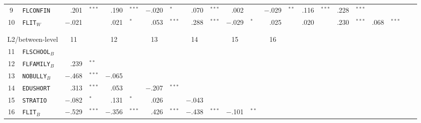 {\begin{tabular}{cl r@{\hskip -0.1mm}l r@{\hskip -0.1mm}l r@{\hskip -0.1mm}l r@{\hskip -0.1mm}l r@{\hskip -0.1mm}l r@{\hskip -0.1mm}l r@{\hskip -0.1mm}l r@{\hskip -0.1mm}l r@{\hskip -0.1mm}l r@{\hskip -0.1mm}l}
            9     & \texttt{FLCONFIN} & .201 & $^{***}$ & .190 & $^{***}$ & $-$.020 & $^{*}$ & .070 & $^{***}$ & .002 &       & $-$.029 & $^{**}$ & .116 & $^{***}$ & .228 & $^{***}$ &       &       &       &  \\
            10    & \texttt{FLIT}$_W$  & $-$.021 &       & .021 & $^{*}$ & .053 & $^{***}$ & .288 & $^{***}$ & $-$.029 & $^{*}$ & .025 &       & .020 &       & .230 & $^{***}$ & .068 & $^{***}$ &       &  \\
            \midrule
                  &       &       &       &       &       &       &       &       &       &       &       &       &       &       &       &       &       &       &       &       &  \\
                  &       &       &       &       &       &       &       &       &       &       &       &       &       &       &       &       &       &       &       &       &  \\
        \cmidrule{1-14}    \multicolumn{2}{c}{L2/between-level} & \multicolumn{1}{c}{11} &       & \multicolumn{1}{c}{12} &       & \multicolumn{1}{c}{13} &       & \multicolumn{1}{c}{14} &       & \multicolumn{1}{c}{15} &       & \multicolumn{1}{c}{16} &       &       &       &       &       &       &       &       &  \\
        \cmidrule{1-14}    11    & \texttt{FLSCHOOL}$_B$ &       &       &       &       &       &       &       &       &       &       &       &       &       &       &       &       &       &       &       &  \\
            12    & \texttt{FLFAMILY}$_B$ & .239 & $^{**}$ &       &       &       &       &       &       &       &       &       &       &       &       &       &       &       &       &       &  \\
            13    & \texttt{NOBULLY}$_B$ & $-$.468 & $^{***}$ & $-$.065 &       &       &       &       &       &       &       &       &       &       &       &       &       &       &       &       &  \\
            14    & \texttt{EDUSHORT} & .313 & $^{***}$ & .053 &       & $-$.207 & $^{***}$  &       &       &       &       &       &       &       &       &       &       &       &       &       &  \\
            15    & \texttt{STRATIO} & $-$.082 & $^{*}$ & .131 & $^{*}$ & .026 &       & $-$.043 &       &       &       &       &       &       &       &       &       &       &       &       &  \\
            16    & \texttt{FLIT}$_B$  & $-$.529 & $^{***}$ & $-$.356 & $^{***}$ & .426 & $^{***}$ & $-$.438 & $^{***}$ & $-$.101 & $^{**}$ &       &       &       &       &       &       &       &       &       &  \\

\end{tabular}}
